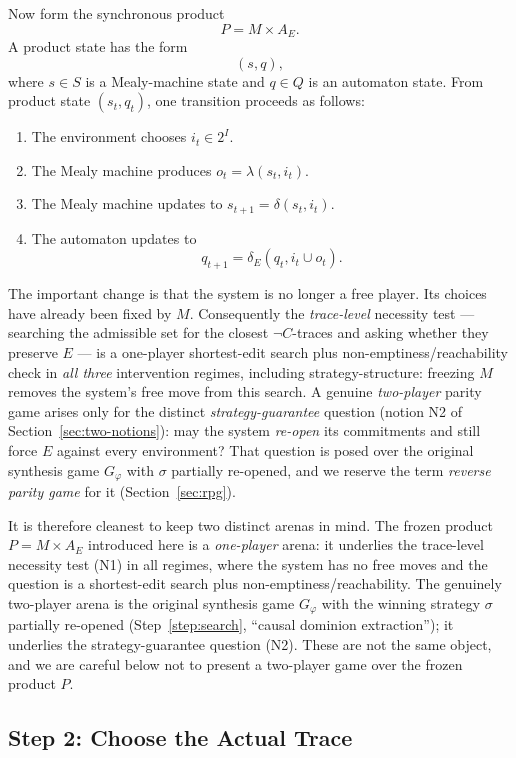 \documentclass[11pt]{article}
\theoremstyle{remark}
\begin{document}
Now form the synchronous product
\[
  P = M \times A_E .
\]
A product state has the form
\[
  (s,q),
\]
where \(s\in S\) is a Mealy-machine state and \(q\in Q\) is an automaton state.
From product state \((s_t,q_t)\), one transition proceeds as follows:
\begin{enumerate}[label=\arabic*.]
  \item The environment chooses \(i_t\in 2^I\).
  \item The Mealy machine produces \(o_t=\lambda(s_t,i_t)\).
  \item The Mealy machine updates to \(s_{t+1}=\delta(s_t,i_t)\).
  \item The automaton updates to
        \[
          q_{t+1}=\delta_E(q_t,i_t\cup o_t).
        \]
\end{enumerate}

The important change is that the system is no longer a free player. Its choices
have already been fixed by \(M\). Consequently the \emph{trace-level} necessity
test --- searching the admissible set for the closest \(\neg C\)-traces and
asking whether they preserve \(E\) --- is a one-player shortest-edit search plus
non-emptiness/reachability check in
\emph{all three} intervention regimes, including strategy-structure: freezing
\(M\) removes the system's free move from this search. A genuine \emph{two-player}
parity game arises only for the distinct \emph{strategy-guarantee} question
(notion N2 of Section~\ref{sec:two-notions}): may the system \emph{re-open} its
commitments and still force \(E\) against every environment? That question is
posed over the original synthesis game \(G_\varphi\) with \(\sigma\) partially
re-opened, and we reserve the term \emph{reverse parity game} for it
(Section~\ref{sec:rpg}).

It is therefore cleanest to keep two distinct arenas in mind. The frozen product
\(P=M\times A_E\) introduced here is a \emph{one-player} arena: it underlies the
trace-level necessity test (N1) in all regimes, where the system has no free moves
and the question is a shortest-edit search plus non-emptiness/reachability. The genuinely
two-player arena is the original synthesis game \(G_\varphi\) with the winning
strategy \(\sigma\) partially re-opened (Step~\ref{step:search}, ``causal
dominion extraction''); it underlies the strategy-guarantee question (N2). These
are not the same object, and we are careful below not to present a two-player game
over the frozen product \(P\).

\subsection{Step 2: Choose the Actual Trace}
\label{step:trace}
\end{document}
